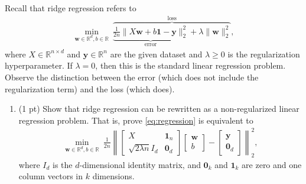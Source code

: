 \documentclass[10pt,letter,notitlepage]{article}
\newcommand{\RR}{\mathds{R}}
\newcommand{\zero}{\mathbf{0}}
\newcommand{\one}{\mathbf{1}}
\newcommand{\wv}{\mathbf{w}}
\newcommand{\yv}{\mathbf{y}}
\newcounter{exercise}
\begin{document}
\begin{exercise}
Recall that ridge regression refers to
\begin{align}
  \min_{\wv\in \RR^d, b\in \RR} ~ \overbrace{\underbrace{\tfrac{1}{2n} \|X \wv+ b\one - \yv\|_2^2}_{\mbox{error}} + \lambda \|\wv\|_2^2}^{\mbox{loss}}, \label{eq:regression}
\end{align}
where $X \in \RR^{n \times d}$ and $\yv \in \RR^n$ are the given dataset and $\lambda \geq 0$ is the regularization hyperparameter.
If $\lambda = 0$, then this is the standard linear regression problem.
  Observe the distinction between the error (which does not include the regularization term) and the loss (which does).

\begin{enumerate}
  \item (1 pt) Show that ridge regression can be rewritten as a non-regularized linear regression problem.
  That is, prove \ref{eq:regression} is equivalent to 
\begin{align}
  \min_{\wv\in \RR^d, b\in \RR} ~ \tfrac{1}{2n} \left\|\begin{bmatrix}
X & \one_n \\
    \sqrt{2\lambda n}I_d & \zero_d
    \end{bmatrix} \begin{bmatrix} \wv  \\ b\end{bmatrix}  - \begin{bmatrix}\yv \\ \zero_d\end{bmatrix}\right\|_2^2 , 
\end{align}
where $I_d$ is the $d$-dimensional identity matrix, and $\zero_k$ and $\one_k$ are zero and one column vectors in $k$ dimensions.
    

\end{enumerate}
\end{exercise}
\end{document}
